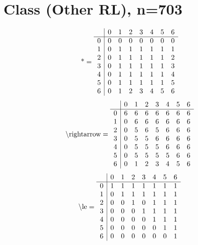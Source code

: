 \documentclass[11pt]{article}
\begin{document}
\section{Class (Other RL), n=703}
\[\text{*} = 
\begin{array}{r | r r r r r r r}
 & 0 & 1 & 2 & 3 & 4 & 5 & 6 \\ \hline
0 & 0 & 0 & 0 & 0 & 0 & 0 & 0 \\
1 & 0 & 1 & 1 & 1 & 1 & 1 & 1 \\
2 & 0 & 1 & 1 & 1 & 1 & 1 & 2 \\
3 & 0 & 1 & 1 & 1 & 1 & 1 & 3 \\
4 & 0 & 1 & 1 & 1 & 1 & 1 & 4 \\
5 & 0 & 1 & 1 & 1 & 1 & 1 & 5 \\
6 & 0 & 1 & 2 & 3 & 4 & 5 & 6 \\
\end{array}
\]
\[\text{\textbackslash rightarrow} = 
\begin{array}{r | r r r r r r r}
 & 0 & 1 & 2 & 3 & 4 & 5 & 6 \\ \hline
0 & 6 & 6 & 6 & 6 & 6 & 6 & 6 \\
1 & 0 & 6 & 6 & 6 & 6 & 6 & 6 \\
2 & 0 & 5 & 6 & 5 & 6 & 6 & 6 \\
3 & 0 & 5 & 5 & 6 & 6 & 6 & 6 \\
4 & 0 & 5 & 5 & 5 & 6 & 6 & 6 \\
5 & 0 & 5 & 5 & 5 & 5 & 6 & 6 \\
6 & 0 & 1 & 2 & 3 & 4 & 5 & 6 \\
\end{array}
\]
\[\text{\textbackslash le} = 
\begin{array}{r | r r r r r r r}
 & 0 & 1 & 2 & 3 & 4 & 5 & 6 \\ \hline
0 & 1 & 1 & 1 & 1 & 1 & 1 & 1 \\
1 & 0 & 1 & 1 & 1 & 1 & 1 & 1 \\
2 & 0 & 0 & 1 & 0 & 1 & 1 & 1 \\
3 & 0 & 0 & 0 & 1 & 1 & 1 & 1 \\
4 & 0 & 0 & 0 & 0 & 1 & 1 & 1 \\
5 & 0 & 0 & 0 & 0 & 0 & 1 & 1 \\
6 & 0 & 0 & 0 & 0 & 0 & 0 & 1 \\
\end{array}
\]
\end{document}
